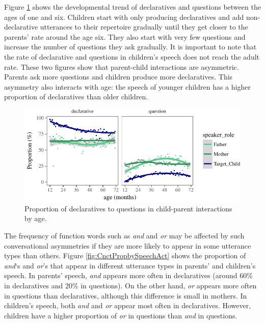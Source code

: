 \documentclass[oneside]{report}
\theoremstyle{definition}
\theoremstyle{definition}
\theoremstyle{definition}
\theoremstyle{remark}
\begin{document}
Figure \ref{fig:utteranceTypeByAgePlot} shows the developmental trend of
declaratives and questions between the ages of one and six. Children
start with only producing declaratives and add non-declarative
utterances to their repertoire gradually until they get closer to the
parents' rate around the age six. They also start with very few
questions and increase the number of questions they ask gradually. It is
important to note that the rate of declarative and questions in
children's speech does not reach the adult rate. These two figures show
that parent-child interactions are asymmetric. Parents ask more
questions and children produce more declaratives. This asymmetry also
interacts with age: the speech of younger children has a higher
proportion of declaratives than older children.
\begin{figure}
\centering
\includegraphics{figs/utteranceTypeByAgePlot-1.pdf}
\caption{\label{fig:utteranceTypeByAgePlot}Proportion of declaratives to
questions in child-parent interactions by age.}
\end{figure}
The frequency of function words such as \emph{and} and \emph{or} may be
affected by such conversational asymmetries if they are more likely to
appear in some utterance types than others. Figure
\ref{fig:CnctPropbySpeechAct} shows the proportion of \emph{and}`s and
\emph{or}'s that appear in different utterance types in parents' and
children's speech. In parents' speech, \emph{and} appears more often in
declaratives (around 60\% in declaratives and 20\% in questions). On the
other hand, \emph{or} appears more often in questions than declaratives,
although this difference is small in mothers. In children's speech, both
\emph{and} and \emph{or} appear most often in declaratives. However,
children have a higher proportion of \emph{or} in questions than
\emph{and} in questions.
\end{document}
